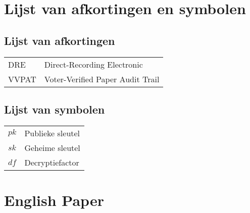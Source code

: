 \documentclass[master=elt,masteroption=im,inputenc=utf8,draft]{kulemt}
\begin{document}
  
  

  \begin{preface}
    
  \end{preface}

  \kulemtmanToC
  \tableofcontents

  \begin{abstract}
    
  \end{abstract}
  
  \listoffiguresandtables
  
  \chapter{Lijst van afkortingen en symbolen}
  \section*{Lijst van afkortingen}
  \begin{flushleft}
    \renewcommand{\arraystretch}{1.1}
    \begin{tabularx}{\textwidth}{@{}p{12mm}X@{}}
      DRE & Direct-Recording Electronic \\
      VVPAT & Voter-Verified Paper Audit Trail
    \end{tabularx}
  \end{flushleft}
  \section*{Lijst van symbolen}
  \begin{flushleft}
    \renewcommand{\arraystretch}{1.1}
    \begin{tabularx}{\textwidth}{@{}p{12mm}X@{}}
      $pk$ & Publieke sleutel \\
      $sk$ & Geheime sleutel \\
      $df$ & Decryptiefactor
    \end{tabularx}
  \end{flushleft}

  \mainmatter

  
  
  
  
  
  
  
  
  
  
  

  \appendix
  
  \chapter{English Paper}
  

  \backmatter

  \nocite{*}

  
  
\end{document}
